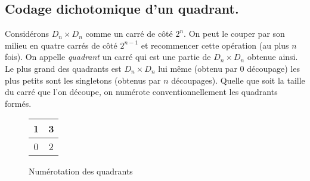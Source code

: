 \subsection{Codage dichotomique d'un quadrant.}
Considérons $D_n \times D_n$ comme un carré de côté $2^n$. On peut le couper par son milieu en quatre carrés de côté $2^{n-1}$ et recommencer cette opération (au plus $n$ fois). On appelle \emph{quadrant} un carré qui est une partie  de $D_n \times D_n$ obtenue ainsi. Le plus grand des quadrants est $D_n \times D_n$ lui même (obtenu par $0$ découpage) les plus petits sont les singletons (obtenus par $n$ découpages).\newline
Quelle que soit la taille du carré que l'on découpe, on numérote conventionnellement les quadrants formés.
\begin{figure}[ht]
 \centering
\renewcommand{\arraystretch}{1.5}
\begin{tabular}{|c|c|}\hline 1&3\\ \hline 0&2\\\hline\end{tabular} 
 \caption{Numérotation des quadrants}
 \label{fig: numquad}
\end{figure}

